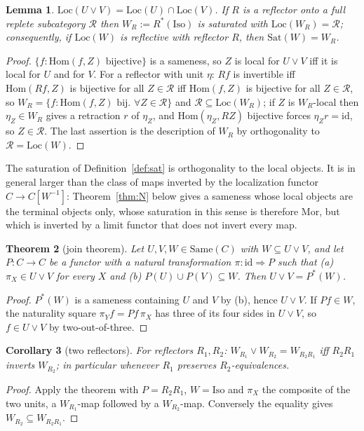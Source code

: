 \documentclass[11pt]{amsart}
\newtheorem{thm}{Theorem}[section]
\newtheorem{lem}[thm]{Lemma}
\newtheorem{cor}[thm]{Corollary}
\theoremstyle{definition}
\newcommand{\Same}{\mathrm{Same}}
\newcommand{\Mor}{\mathrm{Mor}}
\newcommand{\Iso}{\mathrm{Iso}}
\newcommand{\Sat}{\mathrm{Sat}}
\newcommand{\Loc}{\mathrm{Loc}}
\newcommand{\Hom}{\mathrm{Hom}}
\begin{document}
\begin{lem}\label{lem:loc}
$\Loc(U\vee V)=\Loc(U)\cap\Loc(V)$. If $R$ is a reflector onto a full replete
subcategory $\mathcal R$ then $W_R:=R^*(\Iso)$ is saturated with
$\Loc(W_R)=\mathcal R$; consequently, if $\Loc(W)$ is reflective with reflector
$R$, then $\Sat(W)=W_R$.
\end{lem}
\begin{proof}
$\{f:\Hom(f,Z)\text{ bijective}\}$ is a sameness, so $Z$ is local for $U\vee V$
iff it is local for $U$ and for $V$. For a reflector with unit $\eta$: $Rf$ is
invertible iff $\Hom(Rf,Z)$ is bijective for all $Z\in\mathcal R$ iff
$\Hom(f,Z)$ is bijective for all $Z\in\mathcal R$, so
$W_R=\{f:\Hom(f,Z)\text{ bij.\ }\forall Z\in\mathcal R\}$ and
$\mathcal R\subseteq\Loc(W_R)$; if $Z$ is $W_R$-local then $\eta_Z\in W_R$ gives
a retraction $r$ of $\eta_Z$, and $\Hom(\eta_Z,RZ)$ bijective forces
$\eta_Zr=\mathrm{id}$, so $Z\in\mathcal R$. The last assertion is the
description of $W_R$ by orthogonality to $\mathcal R=\Loc(W)$.
\end{proof}

The saturation of Definition~\ref{def:sat} is orthogonality to the local
objects. It is in general larger than the class of maps inverted by the
localization functor $C\to C[W^{-1}]$: Theorem~\ref{thm:N} below gives a sameness
whose local objects are the terminal objects only, whose saturation in this
sense is therefore $\Mor$, but which is inverted by a limit functor that does not
invert every map.

\begin{thm}[join theorem]\label{thm:join}
Let $U,V,W\in\Same(C)$ with $W\subseteq U\vee V$, and let $P\colon C\to C$ be a
functor with a natural transformation $\pi\colon\mathrm{id}\Rightarrow P$ such
that (a) $\pi_X\in U\vee V$ for every $X$ and (b) $P(U)\cup P(V)\subseteq W$.
Then $U\vee V=P^*(W)$.
\end{thm}
\begin{proof}
$P^*(W)$ is a sameness containing $U$ and $V$ by (b), hence $U\vee V$. If
$Pf\in W$, the naturality square $\pi_Yf=Pf\,\pi_X$ has three of its four
sides in $U\vee V$, so $f\in U\vee V$ by two-out-of-three.
\end{proof}

\begin{cor}[two reflectors]\label{cor:two}
For reflectors $R_1,R_2$: $W_{R_1}\vee W_{R_2}=W_{R_2R_1}$ iff $R_2R_1$ inverts
$W_{R_2}$; in particular whenever $R_1$ preserves $R_2$-equivalences.
\end{cor}
\begin{proof}
Apply the theorem with $P=R_2R_1$, $W=\Iso$ and $\pi_X$ the composite of the
two units, a $W_{R_1}$-map followed by a $W_{R_2}$-map. Conversely the equality
gives $W_{R_2}\subseteq W_{R_2R_1}$.
\end{proof}
\end{document}
